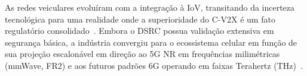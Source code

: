 As redes veiculares evoluíram com a integração à \gls{IoV}, transitando da incerteza tecnológica para uma realidade onde a superioridade do \gls{C-V2X} é um fato regulatório consolidado~\cite{ansari2020v2x}. Embora o \gls{DSRC} possua validação extensiva em segurança básica, a indústria convergiu para o ecossistema celular em função de sua projeção escalonável em direção ao \gls{5G} \gls{NR} em frequências milimétricas (\gls{mmWave}, \gls{FR2}) e aos futuros padrões \gls{6G} operando em faixas Terahertz (THz)~\cite{naik2019evolution}. 

